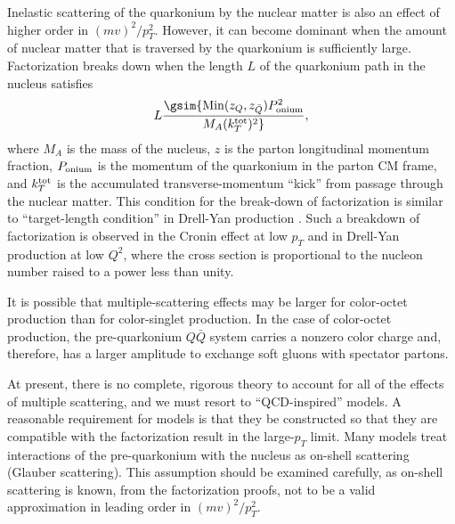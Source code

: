 Inelastic scattering of the quarkonium by the nuclear matter is also an
effect of higher order in $(mv)^2/p_T^2$. However, it can become
dominant when the amount of nuclear matter that is traversed by the
quarkonium is sufficiently large. Factorization breaks down when the
length $L$ of the quarkonium path in the nucleus satisfies
\begin{equation}
L \gsim {{\rm Min}(z_Q,z_{\bar Q})P_{\rm onium}^2\over 
M_A (k_T^{\rm tot})^2},
\end{equation}
where $M_A$ is
the mass of the nucleus, $z$ is the parton longitudinal momentum
fraction, $P_{\rm onium}$ is the momentum of the quarkonium in the
parton CM frame, and $k_T^{\rm tot}$ is the accumulated 
transverse-momentum ``kick'' from passage through the nuclear matter. 
This condition for the break-down of factorization is similar to
``target-length condition'' in Drell-Yan production
\cite{Bodwin:1981fv,Bodwin:1984hc}. Such a breakdown of
factorization is observed in the Cronin effect at low $p_T$ and in
Drell-Yan production at low $Q^2$, where the cross section is
proportional to the nucleon number raised to a power less than unity.

It is possible that multiple-scattering effects may be
larger for color-octet production than for color-singlet production.
In the case of color-octet production, the pre-quarkonium $Q\bar Q$
system carries a nonzero color charge and, therefore, has a larger 
amplitude to exchange soft gluons with spectator partons.

At present, there is no complete, rigorous theory to account for all of
the effects of multiple scattering, and we must resort to
``QCD-inspired'' models. A reasonable requirement for models is that
they be constructed so that they are compatible with the factorization
result in the large-$p_T$ limit. Many models treat interactions of the
pre-quarkonium with the nucleus as on-shell scattering (Glauber
scattering). This assumption should be examined carefully, as on-shell
scattering is known, from the factorization proofs, not to be a valid
approximation in leading order in $(mv)^2/p_T^2$.



